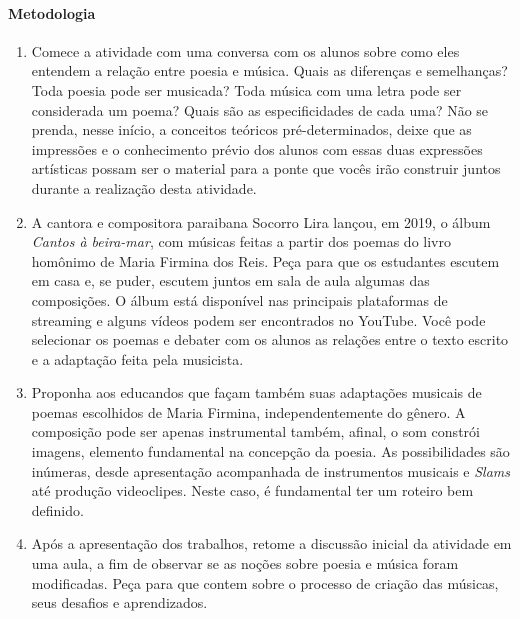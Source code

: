 \documentclass[12pt]{extarticle}
\begin{document}
\paragraph{Metodologia}
\begin{enumerate}
\item
Comece a atividade com uma conversa com os
alunos sobre como eles entendem a relação entre poesia e música. Quais
as diferenças e semelhanças? Toda poesia pode ser musicada? Toda música
com uma letra pode ser considerada um poema? Quais são as
especificidades de cada uma? Não se prenda, nesse início, a conceitos
teóricos pré-determinados, deixe que as impressões e o conhecimento
prévio dos alunos com essas duas expressões artísticas possam ser o
material para a ponte que vocês irão construir juntos durante a
realização desta atividade.

\item
A cantora e compositora paraibana Socorro Lira lançou, em 2019, o
álbum \emph{Cantos à beira-mar}, com músicas feitas a partir dos poemas
do livro homônimo de Maria Firmina dos Reis. Peça para que os estudantes
escutem em casa e, se puder, escutem juntos em sala de aula algumas das
composições. O álbum está disponível nas principais plataformas de
streaming e alguns vídeos podem ser encontrados no YouTube. Você pode
selecionar os poemas e debater com os alunos as relações entre o texto
escrito e a adaptação feita pela musicista.




\item
Proponha aos educandos que façam também suas adaptações musicais de
poemas escolhidos de Maria Firmina, independentemente do gênero. A
composição pode ser apenas instrumental também, afinal, o som constrói
imagens, elemento fundamental na concepção da poesia. As possibilidades
são inúmeras, desde apresentação acompanhada de instrumentos musicais e
\emph{Slams} até produção videoclipes. Neste caso, é fundamental ter um
roteiro bem definido.

\item
Após a apresentação dos trabalhos, retome a discussão inicial da
atividade em uma aula, a fim de observar se as noções sobre poesia e
música foram modificadas. Peça para que contem sobre o processo de
criação das músicas, seus desafios e aprendizados.
\end{enumerate}
\end{document}

